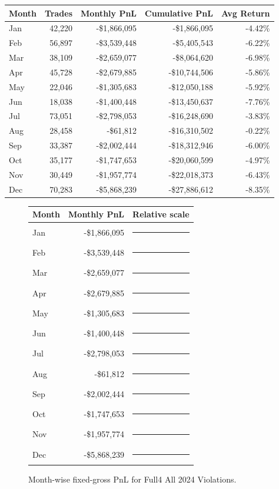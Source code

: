 \documentclass[11pt]{article}
\begin{document}
\begin{center}
\begin{tabular}{@{}lrrrr@{}}
\toprule
Month & Trades & Monthly PnL & Cumulative PnL & Avg Return \\
\midrule
Jan & 42,220 & -\$1,866,095 & -\$1,866,095 & -4.42\% \\
Feb & 56,897 & -\$3,539,448 & -\$5,405,543 & -6.22\% \\
Mar & 38,109 & -\$2,659,077 & -\$8,064,620 & -6.98\% \\
Apr & 45,728 & -\$2,679,885 & -\$10,744,506 & -5.86\% \\
May & 22,046 & -\$1,305,683 & -\$12,050,188 & -5.92\% \\
Jun & 18,038 & -\$1,400,448 & -\$13,450,637 & -7.76\% \\
Jul & 73,051 & -\$2,798,053 & -\$16,248,690 & -3.83\% \\
Aug & 28,458 & -\$61,812 & -\$16,310,502 & -0.22\% \\
Sep & 33,387 & -\$2,002,444 & -\$18,312,946 & -6.00\% \\
Oct & 35,177 & -\$1,747,653 & -\$20,060,599 & -4.97\% \\
Nov & 30,449 & -\$1,957,774 & -\$22,018,373 & -6.43\% \\
Dec & 70,283 & -\$5,868,239 & -\$27,886,612 & -8.35\% \\
\bottomrule
\end{tabular}
\end{center}

\begin{figure}[h]
\centering
\begin{tabular}{@{}lrl@{}}
\toprule
Month & Monthly PnL & Relative scale \\
\midrule
Jan & -\$1,866,095 & \textcolor{red}{\rule{3.2cm}{7pt}}\\
Feb & -\$3,539,448 & \textcolor{red}{\rule{6.0cm}{7pt}}\\
Mar & -\$2,659,077 & \textcolor{red}{\rule{4.5cm}{7pt}}\\
Apr & -\$2,679,885 & \textcolor{red}{\rule{4.6cm}{7pt}}\\
May & -\$1,305,683 & \textcolor{red}{\rule{2.2cm}{7pt}}\\
Jun & -\$1,400,448 & \textcolor{red}{\rule{2.4cm}{7pt}}\\
Jul & -\$2,798,053 & \textcolor{red}{\rule{4.8cm}{7pt}}\\
Aug & -\$61,812 & \textcolor{red}{\rule{0.2cm}{7pt}}\\
Sep & -\$2,002,444 & \textcolor{red}{\rule{3.4cm}{7pt}}\\
Oct & -\$1,747,653 & \textcolor{red}{\rule{3.0cm}{7pt}}\\
Nov & -\$1,957,774 & \textcolor{red}{\rule{3.3cm}{7pt}}\\
Dec & -\$5,868,239 & \textcolor{red}{\rule{10.0cm}{7pt}}\\
\bottomrule
\end{tabular}
\caption{Month-wise fixed-gross PnL for Full4 All 2024 Violations.}
\end{figure}
\end{document}
